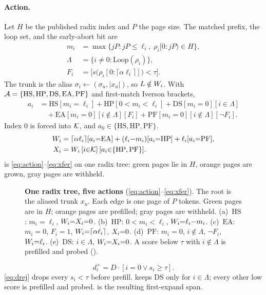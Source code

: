 \paragraph{Action.}
Let $H$ be the published radix index and $P$ the page size.
The matched prefix, the loop set, and the early-abort bit are
\begin{align}
m_i &= \max\{jP: jP\le\ell_i,\;\rho_i[0{:}jP)\in H\}, \label{eq:mi}\\
\Lambda &= \{i\neq 0:\mathrm{Loop}(\rho_i)\}, \nonumber\\
F_i &= \bigl[s\bigl(\rho_i[0{:}\lceil\alpha\ell_i\rceil]\bigr)<\tau\bigr]. \nonumber
\end{align}
The trunk is the alias $\sigma_i\leftarrow(\sigma_u,|x_u|)$, so $L\notin W_i$.
With $\mathcal{A}=\{\mathrm{HS},\mathrm{HP},\mathrm{DS},\mathrm{EA},\mathrm{PF}\}$ and first-match Iverson brackets,
\begin{equation}
\label{eq:action}
\begin{aligned}
a_i &= \mathrm{HS}[m_i{=}\ell_i]
+\mathrm{HP}[0{<}m_i{<}\ell_i]
+\mathrm{DS}[m_i{=}0][i{\in}\Lambda]\\
&\quad+\mathrm{EA}[m_i{=}0][i{\notin}\Lambda][F_i]
+\mathrm{PF}[m_i{=}0][i{\notin}\Lambda][\neg F_i].
\end{aligned}
\end{equation}
Index $0$ is forced into $\mathcal{K}$, and $a_0\in\{\mathrm{HS},\mathrm{HP},\mathrm{PF}\}$.
\begin{align}
W_i &= \lceil\alpha\ell_i\rceil[a_i{=}\mathrm{EA}]+(\ell_i{-}m_i)[a_i{=}\mathrm{HP}]+\ell_i[a_i{=}\mathrm{PF}], \label{eq:work}\\
X_i &= W_i\,[i{\in}\mathcal{K}]\,[a_i{\in}\{\mathrm{HP},\mathrm{PF}\}]. \label{eq:xfer}
\end{align}
 is \eqref{eq:action}--\eqref{eq:xfer} on one radix tree: green pages lie in $H$, orange pages are grown, gray pages are withheld.

\begin{figure}[t]
\centering
\resizebox{\textwidth}{!}{}
\caption{\textbf{One radix tree, five actions} (\eqref{eq:action}--\eqref{eq:xfer}).
The root is the aliased trunk $x_u$.
Each edge is one page of $P$ tokens.
Green pages are in $H$; orange pages are prefilled; gray pages are withheld.
(a)~$\mathrm{HS}$: $m_i{=}\ell_i$, $W_i{=}X_i{=}0$.
(b)~$\mathrm{HP}$: $0{<}m_i{<}\ell_i$, $W_i{=}\ell_i{-}m_i$.
(c)~$\mathrm{EA}$: $m_i{=}0$, $F_i{=}1$, $W_i{=}\lceil\alpha\ell_i\rceil$, $X_i{=}0$.
(d)~$\mathrm{PF}$: $m_i{=}0$, $i{\notin}\Lambda$, $\neg F_i$, $W_i{=}\ell_i$.
(e)~$\mathrm{DS}$: $i{\in}\Lambda$, $W_i{=}X_i{=}0$.
A score below $\tau$ with $i{\notin}\Lambda$ is prefilled and probed ().}
\label{fig:radix}
\end{figure}
\begin{equation}
\label{eq:drej}
d_i^{\times}=D\cdot[i=0\lor s_i\ge\tau].
\end{equation}
\eqref{eq:drej} drops every $s_i{<}\tau$ before prefill.
 keeps $\mathrm{DS}$ only for $i{\in}\Lambda$; every other low score is prefilled and probed.
 is the resulting first-expand span.

